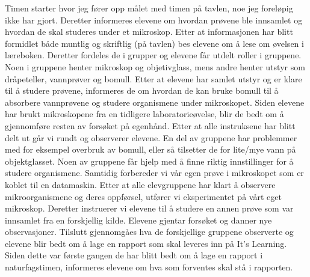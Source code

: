\documentclass[main.tex]{subfiles}
\begin{document}
Timen starter hvor jeg fører opp målet med timen på tavlen, noe jeg foreløpig ikke har gjort. Deretter 
informeres elevene om hvordan prøvene ble innsamlet
og hvordan de skal studeres under et mikroskop. Etter at informasjonen har blitt formidlet både
muntlig og skriftlig (på tavlen) bes elevene om å lese om øvelsen i læreboken. Deretter
fordeles de i grupper og elevene får utdelt roller i gruppene. Noen i gruppene henter
mikroskop og objetivglass, mens andre henter utstyr som dråpeteller, vannprøver og bomull.
Etter at elevene har samlet utstyr og er klare til å studere prøvene, informeres de
om hvordan de kan bruke bomull til å absorbere vannprøvene og studere organismene under mikroskopet.
Siden elevene har brukt mikroskopene fra en tidligere laboratorieøvelse, blir de bedt om å 
gjennomføre resten av forsøket på egenhånd. Etter at alle instruksene har blitt delt ut går vi
rundt og observerer elevene. 
En del av gruppene har problemmer med for eksempel overbruk av bomull, 
eller så tilsetter de for lite/mye vann på objektglasset. Noen av gruppene får hjelp med å finne 
riktig innstillinger for å studere organismene. 
Samtidig forbereder vi vår egen prøve i mikroskopet som er koblet til en datamaskin. Etter at alle elevgruppene 
har klart å observere mikroorganismene og deres oppførsel, utfører vi eksperimentet på vårt eget mikroskop.
Deretter instruerer vi elevene til å studere en annen prøve som var innsamlet fra en forskjellig kilde. Elevene 
gjentar forsøket og danner nye observasjoner. 
Tilslutt gjennomgåes hva de forskjellige gruppene observerte og elevene blir bedt om å lage en rapport som skal 
leveres inn på It's Learning. Siden dette var første gangen de har blitt bedt om å lage en rapport i naturfagstimen, 
informeres elevene om hva som forventes skal stå i rapporten.
\end{document}

